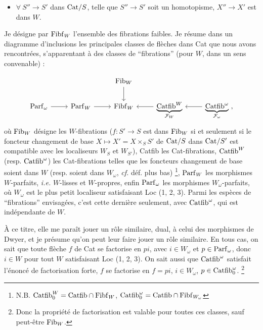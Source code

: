 \begin{itemize}[leftmargin=2cm]
\item[\textbf{(Ff$'$)}] $\forall\ S'' \longrightarrow S'$ dans $\mathrm{Cat}/S$, telle que $S'' \longrightarrow S'$ soit un homotopisme, $X'' \longrightarrow X'$ est dans $W$.
\end{itemize}

Je désigne par $\mathrm{Fibf}_W$ l'ensemble des fibrations faibles. Je résume dans un diagramme d'inclusions les principales classes de flèches dans Cat que nous avons rencontrées, s'apparentant à des classes de “fibrations” (pour $W$, dans un sens convenable) :


\[
\begin{tikzcd}
 & & \Fib_W \arrow[d] & & \\
\Parf_\omega \arrow[r] & \Parf_W \arrow[r] & \Fibf_W & \underbrace{\Catfib^W}_{\mathcal{F}_W} \arrow[l] & \underbrace{\Catfib^\omega}_{\mathcal{F}_\omega} \arrow[l] \ ,
\end{tikzcd}
\]
où $\mathrm{Fib}_W$ désigne les $W$-fibrations ($f : S' \longrightarrow S$ est dans $\mathrm{Fib}_W$ si et seulement si le foncteur changement de base $X \longmapsto X' = X \times_S S'$ de $\mathrm{Cat}/S$ dans $\mathrm{Cat}/S'$ est compatible avec les localiseurs $W_S$ et $W_{S'}$), Catfib les Cat-fibrations, $\mathrm{Catfib}^W$ (resp. $\mathrm{Catfib}^\omega$) les Cat-fibrations telles que les foncteurs changement de base soient dans $W$ (resp. soient dans $W_\omega$, \textit{cf.} déf. plus bas) \footnote[20]{N.B. $\mathrm{Catfib}_0^W = \mathrm{Catfib} \cap \mathrm{Fibf}_W$, $\mathrm{Catfib}_0^\omega = \mathrm{Catfib} \cap \mathrm{Fibf}_{W_\omega}$}, $\mathrm{Parf}_W$ les morphismes $W$-parfaits, \textit{i.e.} $W$-lisses et $W$-propres, enfin $\mathrm{Parf}_\omega$ les morphismes $W_\omega$-parfaits, où $W_\omega$ est le plus petit localiseur satisfaisant Loc (1, 2, 3). Parmi les espèces de “fibrations” envisagées, c'est cette dernière seulement, avec $\mathrm{Catfib}^\omega$, qui est indépendante de $W$.

À ce titre, elle me paraît jouer un rôle similaire, dual, à celui des morphismes de Dwyer, et je présume qu'on peut leur faire jouer un rôle similaire. En tous  cas, on sait que toute flèche $f$ de Cat se factorise en $pi$, avec $i \in W_\omega$ et $p \in \mathrm{Parf}_\omega$, donc $i \in W$ pour tout $W$ satisfaisant Loc (1, 2, 3). On sait aussi que $\mathrm{Catfib}^\omega$ satisfait l'énoncé de factorisation forte, $f$ se factorise en $f = pi$, $i \in W_\omega$, $p \in \mathrm{Catfib}_0^\omega$. \footnote[21]{Donc la propriété de factorisation est valable pour toutes ces classes, sauf peut-être $\mathrm{Fib}_W$.}

